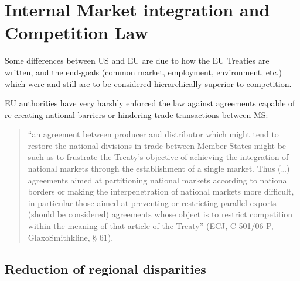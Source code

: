 
\section{Internal Market integration and Competition Law}

    Some differences between US and EU are due to how the EU Treaties are written, and the end-goals (common market, employment, environment, etc.) which were and still are to be considered hierarchically superior to competition.

    
    EU authorities have very harshly enforced the law against agreements capable of re-creating national barriers or hindering trade transactions between MS: 
    \begin{quote}
        “an agreement between producer and distributor which might tend to restore the national divisions in trade between Member States might be such as to frustrate the Treaty’s objective of achieving the integration of national markets through the establishment of a single market. Thus (…) agreements aimed at partitioning national markets according to national borders or making the interpenetration of national markets more difficult, in particular those aimed at preventing or restricting parallel exports (should be considered) agreements whose object is to restrict competition within the meaning of that article of the Treaty” (ECJ, C-501/06 P, GlaxoSmithkline, § 61).
    \end{quote}


\newpage
    \subsection{Reduction of regional disparities}


